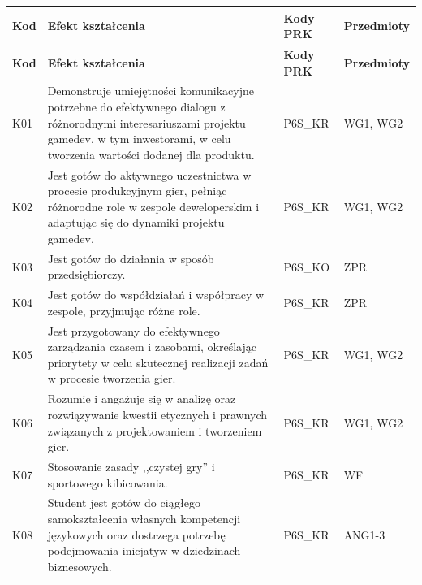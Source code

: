\documentclass[12pt,a4paper]{article}
\newcommand{\thdrule}{\noalign{\global\setlength{\extrarowheight}{0pt}}}
\newcommand{\thdend}{\noalign{\global\setlength{\extrarowheight}{4pt}}}
\begin{document}
{\scriptsize
\begin{longtable}{m{1cm}m{8.8cm}m{2.1cm}m{2.5cm}}
\thdrule\toprule
\rowcolor{pjatkRed} {\color{white}\footnotesize\textbf{\vphantom{Ag}Kod}} & {\color{white}\footnotesize\textbf{\vphantom{Ag}Efekt kształcenia}} & {\color{white}\footnotesize\textbf{\vphantom{Ag}Kody PRK}} & {\color{white}\footnotesize\textbf{\vphantom{Ag}Przedmioty}} \\
\midrule\thdend
\endfirsthead
\thdrule\toprule
\rowcolor{pjatkRed} {\color{white}\footnotesize\textbf{\vphantom{Ag}Kod}} & {\color{white}\footnotesize\textbf{\vphantom{Ag}Efekt kształcenia}} & {\color{white}\footnotesize\textbf{\vphantom{Ag}Kody PRK}} & {\color{white}\footnotesize\textbf{\vphantom{Ag}Przedmioty}} \\
\midrule\thdend
\endhead
\rowcolor{tableRowLight} K01 & Demonstruje umiejętności komunikacyjne potrzebne do efektywnego dialogu z różnorodnymi interesariuszami projektu gamedev, w tym inwestorami, w celu tworzenia wartości dodanej dla produktu. & {\scriptsize P6S\_KR} & {\scriptsize WG1, WG2} \\
\rowcolor{tableRowAlt} K02 & Jest gotów do aktywnego uczestnictwa w procesie produkcyjnym gier, pełniąc różnorodne role w zespole deweloperskim i adaptując się do dynamiki projektu gamedev. & {\scriptsize P6S\_KR} & {\scriptsize WG1, WG2} \\
\rowcolor{tableRowLight} K03 & Jest gotów do działania w sposób przedsiębiorczy. & {\scriptsize P6S\_KO} & {\scriptsize ZPR} \\
\rowcolor{tableRowAlt} K04 & Jest gotów do współdziałań i współpracy w zespole, przyjmując różne role. & {\scriptsize P6S\_KR} & {\scriptsize ZPR} \\
\rowcolor{tableRowLight} K05 & Jest przygotowany do efektywnego zarządzania czasem i zasobami, określając priorytety w celu skutecznej realizacji zadań w procesie tworzenia gier. & {\scriptsize P6S\_KR} & {\scriptsize WG1, WG2} \\
\rowcolor{tableRowAlt} K06 & Rozumie i angażuje się w analizę oraz rozwiązywanie kwestii etycznych i prawnych związanych z projektowaniem i tworzeniem gier. & {\scriptsize P6S\_KR} & {\scriptsize WG1, WG2} \\
\rowcolor{tableRowLight} K07 & Stosowanie zasady ,,czystej gry” i sportowego kibicowania. & {\scriptsize P6S\_KR} & {\scriptsize WF} \\
\rowcolor{tableRowAlt} K08 & Student jest gotów do ciągłego samokształcenia własnych kompetencji językowych oraz dostrzega potrzebę podejmowania inicjatyw w dziedzinach biznesowych. & {\scriptsize P6S\_KR} & {\scriptsize ANG1-3} \\

\end{longtable}}
\end{document}
